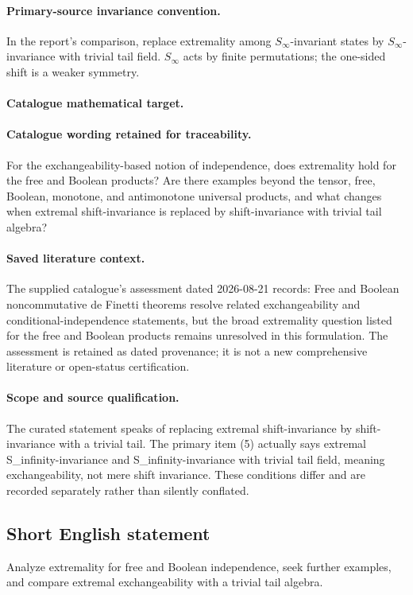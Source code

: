 \documentclass[11pt]{article}
\begin{document}
\paragraph{Primary-source invariance convention.} In the report's comparison, replace extremality among $S_\infty$-invariant states by $S_\infty$-invariance with trivial tail field. $S_\infty$ acts by finite permutations; the one-sided shift is a weaker symmetry.

\paragraph{Catalogue mathematical target.}
\paragraph{Catalogue wording retained for traceability.}
For the exchangeability-based notion of independence, does extremality hold for the free and Boolean products? Are there examples beyond the tensor, free, Boolean, monotone, and antimonotone universal products, and what changes when extremal shift-invariance is replaced by shift-invariance with trivial tail algebra?

\paragraph{Saved literature context.} The supplied catalogue's assessment dated 2026-08-21 records: Free and Boolean noncommutative de Finetti theorems resolve related exchangeability and conditional-independence statements, but the broad extremality question listed for the free and Boolean products remains unresolved in this formulation. The assessment is retained as dated provenance; it is not a new comprehensive literature or open-status certification.
\paragraph{Scope and source qualification.}The curated statement speaks of replacing extremal shift-invariance by shift-invariance with a trivial tail. The primary item (5) actually says extremal S_infinity-invariance and S_infinity-invariance with trivial tail field, meaning exchangeability, not mere shift invariance. These conditions differ and are recorded separately rather than silently conflated.
\subsection{Short English statement}
Analyze extremality for free and Boolean independence, seek further examples, and compare extremal exchangeability with a trivial tail algebra.
\end{document}
